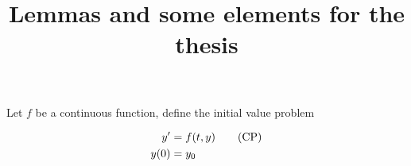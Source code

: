 \documentclass{amsart}
\title{\textbf{Lemmas and some elements for the thesis}}
\author{\quad}
\def\fd{\mathfrak{D}}
\begin{document}
\maketitle










\begin{definition}
Let $f$ be a continuous function, define the initial value problem

\begin{align}
\label{cp}
y' &= f(t, y) \tag{CP}\\
y(0) &= y_0 \notag{}
\end{align}

\end{definition}
\end{document}
